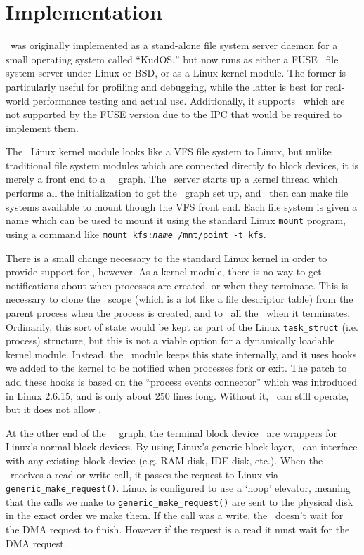 \section{Implementation}
\label{sec:implementation}

\Kudos\ was originally implemented as a stand-alone file system server daemon
for a small operating system called ``KudOS,'' but now runs as either a
FUSE~\cite{fuse} file system server under Linux or BSD, or as a Linux kernel
module. The former is particularly useful for profiling and debugging, while the
latter is best for real-world performance testing and actual use. Additionally,
it supports \opgroups\ which are not supported by the FUSE version due to the
IPC that would be required to implement them.

The \Kudos\ Linux kernel module looks like a VFS file system to Linux, but
unlike traditional file system modules which are connected directly to block
devices, it is merely a front end to a \Kudos\ \module\ graph. The \Kudos\
server starts up a kernel thread which performs all the initialization to get
the \module\ graph set up, and \modules\ then can make file systems available to
mount though the VFS front end. Each file system is given a name which can be
used to mount it using the standard Linux \texttt{mount} program, using a
command like \mbox{\texttt{mount kfs:\textit{name} /mnt/point -t kfs}}.

There is a small change necessary to the standard Linux kernel in order to
provide support for \opgroups, however. As a kernel module, there is no way to
get notifications about when processes are created, or when they terminate. This
is necessary to clone the \opgroup\ scope (which is a lot like a file descriptor
table) from the parent process when the process is created, and to \abandon\ all
the \opgroups\ when it terminates. Ordinarily, this sort of state would be kept
as part of the Linux \texttt{task\_struct} (i.e. process) structure, but this is
not a viable option for a dynamically loadable kernel module. Instead, the
\Kudos\ module keeps this state internally, and it uses hooks we added to the
kernel to be notified when processes fork or exit. The patch to add these hooks
is based on the ``process events connector'' which was introduced in Linux
2.6.15, and is only about 250 lines long. Without it, \Kudos\ can still operate,
but it does not allow \opgroups.

At the other end of the \Kudos\ \module\ graph, the terminal block
device \modules\ are wrappers for Linux's normal block devices. By
using Linux's generic block layer, \Kudos\ can interface with any
existing block device (e.g. RAM disk, IDE disk, etc.). When the
\module\ receives a read or write call, it passes the request to Linux
via \texttt{generic\_make\_request()}. Linux is configured to use a
`noop' elevator, meaning that the calls we make to
\texttt{generic\_make\_request()} are sent to the physical disk in the
exact order we make them. If the call was a write, the \module\
doesn't wait for the DMA request to finish. However if the request is
a read it must wait for the DMA request.

